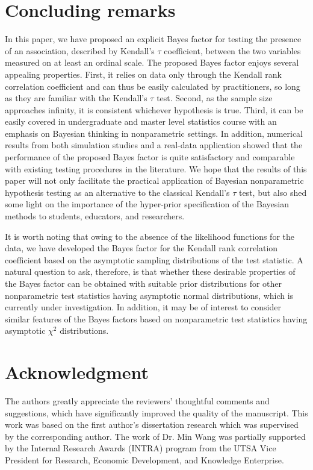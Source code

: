 \documentclass[11pt]{article}
\begin{document}
\section{Concluding remarks} \label{section:05}

In this paper, we have proposed an explicit Bayes factor for testing the presence of an association, described by Kendall's $\tau$ coefficient, between the two variables measured on at least an ordinal scale. The proposed Bayes factor enjoys several appealing properties. First, it relies on data only through the Kendall rank correlation coefficient and can thus be easily calculated by practitioners, so long as they are familiar with the Kendall's $\tau$ test. Second, as the sample size approaches infinity, it is consistent whichever hypothesis is true. Third, it can be easily covered in undergraduate and master level statistics course  with an emphasis on Bayesian thinking in nonparametric settings. In addition, numerical results from both simulation studies and a real-data application showed that the performance of the proposed Bayes factor is quite satisfactory and comparable with existing testing procedures in the literature. We hope that the results of this paper will not only facilitate the practical application of Bayesian nonparametric hypothesis testing as an alternative to the classical Kendall's $\tau$ test, but also shed some light on the importance of the hyper-prior specification of the Bayesian methods to students, educators, and researchers.

It is worth noting that owing to the absence of the likelihood functions for the data, we have developed the Bayes factor for the Kendall rank correlation coefficient based on the asymptotic sampling distributions of the test statistic. A natural question to ask, therefore, is that whether these desirable properties of the Bayes factor can be obtained with suitable prior distributions for other nonparametric test statistics having asymptotic normal distributions, which is currently under investigation.  In addition, it may be of interest to consider similar features of the Bayes factors based on nonparametric test statistics having asymptotic $\chi^2$ distributions.


\section*{Acknowledgment}
The authors greatly appreciate the reviewers' thoughtful comments and suggestions, which have significantly improved the quality of the manuscript. This work was based on the first author's dissertation research which was supervised by the corresponding author. The work of Dr. Min Wang was partially supported by the Internal Research Awards (INTRA) program from the UTSA Vice President for Research, Economic Development, and Knowledge Enterprise.
\end{document}
